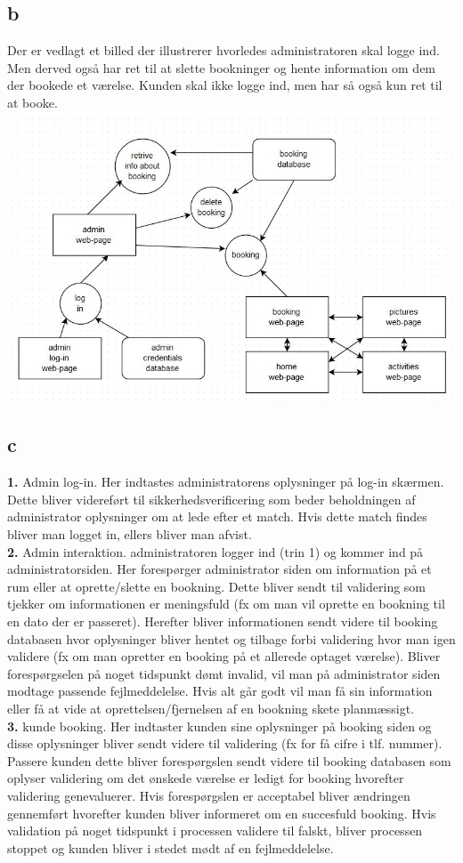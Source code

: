 \documentclass[12pt,a4paper]{article}
\begin{document}
\subsection{b}
Der er vedlagt et billed der illustrerer hvorledes administratoren skal logge ind. Men derved også har ret til at slette bookninger og hente information om dem der bookede et værelse. Kunden skal ikke logge ind, men har så også kun ret til at booke.\\ 
\includegraphics[scale=0.7]{useCaseModel.jpg}
\subsection{c}
\textbf{1.} Admin log-in. Her indtastes administratorens oplysninger på log-in skærmen. Dette bliver 	videreført til sikkerhedsverificering som beder beholdningen af administrator oplysninger 	om at lede efter et match. Hvis dette match findes bliver man logget in, ellers bliver man 	afvist. \\
	\textbf{2.} Admin interaktion. administratoren logger ind (trin 1) og kommer ind på 	administratorsiden. Her forespørger administrator siden om information på et rum eller at 	oprette/slette en bookning. Dette bliver sendt til validering som tjekker om informationen er 	meningsfuld (fx om man vil oprette en bookning til en dato der er passeret). Herefter bliver 	informationen sendt videre til booking databasen hvor oplysninger bliver hentet og tilbage 	forbi validering hvor man igen validere (fx om man opretter en booking på et allerede 	optaget værelse). Bliver forespørgselen på noget tidspunkt dømt invalid, vil man på 	administrator siden modtage passende fejlmeddelelse. Hvis alt går godt vil man få sin 	information eller få at vide at oprettelsen/fjernelsen af en bookning skete planmæssigt.\\
	\textbf{3.} kunde booking. Her indtaster kunden sine oplysninger på booking siden og disse 	oplysninger bliver sendt videre til validering (fx for få cifre i tlf. nummer). Passere kunden 	dette bliver forespørgslen sendt videre til booking databasen som oplyser validering om det 	ønskede værelse er ledigt for booking hvorefter validering genevaluerer. Hvis forespørgslen 	er acceptabel bliver ændringen gennemført hvorefter kunden bliver informeret om en 		succesfuld booking. Hvis validation på noget tidspunkt i processen validere til falskt, bliver 	processen stoppet og kunden bliver i stedet mødt af en fejlmeddelelse.
\end{document}
